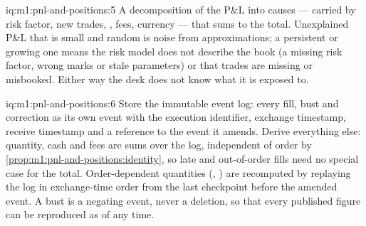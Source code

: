 \begin{solution}{iq:m1:pnl-and-positions:5}
A decomposition of the P\&L into causes --- carried  by risk
factor, new trades, , fees, currency --- that sums to the total.
Unexplained P\&L that is small and random is noise from approximations; a
persistent or growing one means the risk model does not describe the book (a
missing risk factor, wrong marks or stale parameters) or that trades are
missing or misbooked. Either way the desk does not know what it is exposed
to.
\end{solution}

\begin{solution}{iq:m1:pnl-and-positions:6}
Store the immutable event log: every fill, bust and correction as its own
event with the execution identifier, exchange timestamp, receive timestamp
and a reference to the event it amends. Derive everything else: quantity,
cash and fees are sums over the log, independent of order by
\cref{prop:m1:pnl-and-positions:identity}, so late and out-of-order fills
need no special case for the total. Order-dependent quantities (,
) are recomputed by replaying the log in exchange-time order
from the last checkpoint before the amended event. A bust is a negating
event, never a deletion, so that every published figure can be reproduced as
of any time.
\end{solution}
